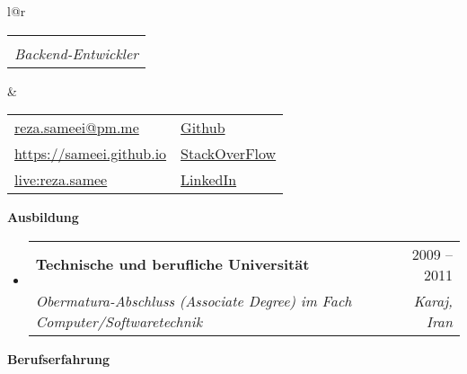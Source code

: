 \documentclass[letterpaper,12pt]{article}[leftmargin=*]
\makeatletter
\def \fullname {Reza Sameei}
\def \subtitle {Backend-Entwickler}
\def \linkedinicon {\faLinkedin}
\def \linkedinlink {http://linkedin.com/in/reza-sameei/}
\def \linkedintext {LinkedIn}
\def \phoneicon {\faPhone}
\def \phonetext {+98-912-666-2695}
\def \skypeicon {\faSkype}
\def \skypelink {https://join.skype.com/invite/nINGOAMPxZdX}
\def \skypename {live:reza.samee}
\def \emailicon {\faEnvelope}
\def \emaillink {mailto:reza.sameei@pm.me}
\def \emailtext {reza.sameei@pm.me}
\def \githubicon {\faGithub}
\def \githublink {https://github.com/sameei}
\def \githubtext {Github}
\def \stacksiteicon {\faStackOverflow}
\def \stacksitelink {https://stackoverflow.com/users/998642/reza-sameei}
\def \stacksitetext {StackOverFlow}
\def \websiteicon {\faGlobe}
\def \websitelink {https://sameei.github.io/}
\def \websitetext {https://sameei.github.io}
\def \headertype {\doublecol} %
\def \entryspacing {-0pt}
\def \linkedin {\linkedinicon \hspace{3pt}\href{\linkedinlink}{\linkedintext}}
\def \phone {\phoneicon \hspace{3pt}{ \phonetext}}
\def \skype {\skypeicon \hspace{3pt}\href{\skypelink}{\skypename}}
\def \email {\emailicon \hspace{3pt}\href{\emaillink}{\emailtext}}
\def \github {\githubicon \hspace{3pt}\href{\githublink}{\githubtext}}
\def \stackoverflow {\stacksiteicon \hspace{3pt}\href{\stacksitelink}{\stacksitetext}}
\def \website {\websiteicon \hspace{3pt}\href{\websitelink}{\websitetext}}
\renewcommand{\section}[2]{\vspace{5pt}
  \colorbox{secondary}{\color{white}\raggedbottom\normalsize\textbf{{#1}{\hspace{7pt}#2}}}
}
\newcommand{\resumeEntryStart}{\begin{itemize}[leftmargin=2.5mm]}
\newcommand{\resumeEntryEnd}{\end{itemize}\vspace{\entryspacing}}
\newcommand{\resumeEntryTSDL}[4]{
  \vspace{-1pt}\item[]
    \begin{tabular*}{0.97\textwidth}{l@{\extracolsep{\fill}}r}
      \textbf{\color{primary}#1} & {\firabook\color{accent}\small#2} \\
      \textit{\color{accent}\small#3} & \textit{\color{accent}\small#4} \\
    \end{tabular*}\vspace{-6pt}
}
\newcommand{\resumeEntryS}[2]{
  \item[]\small{
    \textbf{\color{primary}#1 }{ #2 \vspace{-6pt}}
  }
}
\newcommand{\doublecol}[6]{
  \begin{tabular*}{\textwidth}{l@{\extracolsep{\fill}}r}
    {
      \begin{tabular}[c]{l}
        \fontsize{35}{45}\selectfont{\color{primary}{{\textbf{\fullname}}}}
		\\
        {\textit{\subtitle}} %
      \end{tabular}
    } & {
      \begin{tabular}[c]{l@{\hspace{1.5em}}l}
        {\small#4} & {\small#1} \\
        {\small#5} & {\small#2} \\
        {\small#6} & {\small#3}
      \end{tabular}
    }
  \end{tabular*}
}
\newcommand{\singlecol}[6]{
  \begin{tabular*}{\textwidth}{l@{\extracolsep{\fill}}r}
    {
      \begin{tabular}[b]{l}
        \fontsize{35}{45}\selectfont{\color{primary}{{\textbf{\fullname}}}} \\
        {\textit{\subtitle}} %
      \end{tabular}
    } & {
      \begin{tabular}[c]{l}
        {\small#1} \\
        {\small#2} \\
        {\small#3} \\
        {\small#4} \\
        {\small#5} \\
        {\small#6}
      \end{tabular}
    }
  \end{tabular*}
}
\makeatother
\begin{document}


\headertype{\github}{\stackoverflow}{\linkedin}{\email}{\website}{\skype}{} %





\section{\faGraduationCap}{Ausbildung}

  \resumeEntryStart
    \resumeEntryTSDL
      {Technische und berufliche Universität}{2009 -- 2011}
      {Obermatura-Abschluss (Associate Degree) im Fach Computer/Softwaretechnik}{Karaj, Iran}
  \resumeEntryEnd

 \section{\faBicycle}{Berufserfahrung}
\end{document}
